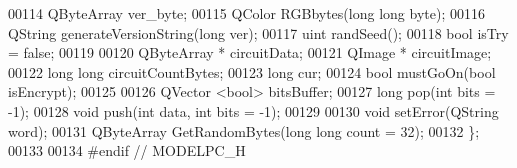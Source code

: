 \begin{DoxyCode}
00114     QByteArray ver\_byte;
00115     QColor RGBbytes(\textcolor{keywordtype}{long} \textcolor{keywordtype}{long} byte);
00116     QString generateVersionString(\textcolor{keywordtype}{long} ver);
00117     uint randSeed();
00118     \textcolor{keywordtype}{bool} isTry = \textcolor{keyword}{false};
00119 
00120     QByteArray * circuitData;
00121     QImage * circuitImage;
00122     \textcolor{keywordtype}{long} \textcolor{keywordtype}{long} circuitCountBytes;
00123     \textcolor{keywordtype}{long} cur;
00124     \textcolor{keywordtype}{bool} mustGoOn(\textcolor{keywordtype}{bool} isEncrypt);
00125 
00126     QVector <bool> bitsBuffer;
00127     \textcolor{keywordtype}{long} pop(\textcolor{keywordtype}{int} bits = -1);
00128     \textcolor{keywordtype}{void} push(\textcolor{keywordtype}{int} data, \textcolor{keywordtype}{int} bits = -1);
00129 
00130     \textcolor{keywordtype}{void} setError(QString word);
00131     QByteArray GetRandomBytes(\textcolor{keywordtype}{long} \textcolor{keywordtype}{long} count = 32);
00132 \};
00133 
00134 \textcolor{preprocessor}{#endif // MODELPC\_H}
\end{DoxyCode}
